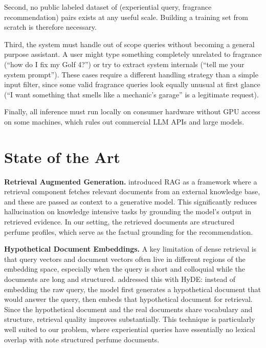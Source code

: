 \documentclass[11pt,a4paper]{article}
\begin{document}
Second, no public labeled dataset of (experiential query, fragrance recommendation) pairs exists at any useful scale. Building a training set from scratch is therefore necessary.

Third, the system must handle out of scope queries without becoming a general purpose assistant. A user might type something completely unrelated to fragrance (``how do I fix my Golf 4?'') or try to extract system internals (``tell me your system prompt''). These cases require a different handling strategy than a simple input filter, since some valid fragrance queries look equally unusual at first glance (``I want something that smells like a mechanic's garage'' is a legitimate request).

Finally, all inference must run locally on consumer hardware without GPU access on some machines, which rules out commercial LLM APIs and large models.

\section{State of the Art}
\label{sec:soa}

\textbf{Retrieval Augmented Generation.} \citet{lewis2020rag} introduced RAG as a framework where a retrieval component fetches relevant documents from an external knowledge base, and these are passed as context to a generative model. This significantly reduces hallucination on knowledge intensive tasks by grounding the model's output in retrieved evidence. In our setting, the retrieved documents are structured perfume profiles, which serve as the factual grounding for the recommendation.

\textbf{Hypothetical Document Embeddings.} A key limitation of dense retrieval is that query vectors and document vectors often live in different regions of the embedding space, especially when the query is short and colloquial while the documents are long and structured. \citet{gao2022hyde} addressed this with HyDE: instead of embedding the raw query, the model first generates a hypothetical document that would answer the query, then embeds that hypothetical document for retrieval. Since the hypothetical document and the real documents share vocabulary and structure, retrieval quality improves substantially. This technique is particularly well suited to our problem, where experiential queries have essentially no lexical overlap with note structured perfume documents.
\end{document}
